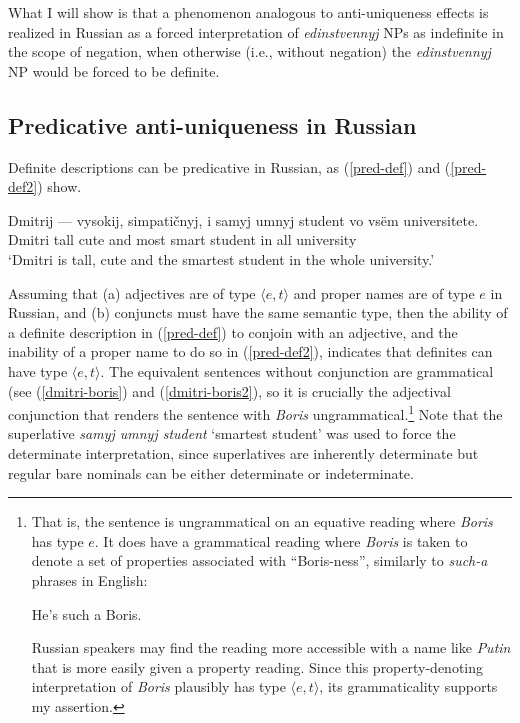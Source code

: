 What I will show is that a phenomenon analogous to anti-uniqueness effects is realized in Russian as a forced interpretation of \textit{edinstvennyj} NPs as indefinite in the scope of negation, when otherwise (i.e., without negation) the \textit{edinstvennyj} NP would be forced to be definite.

\subsection{Predicative anti-uniqueness in Russian}
Definite descriptions can be predicative in Russian, as (\ref{pred-def}) and (\ref{pred-def2}) show.

\begin{exe}
	\ex \label{pred-def} \gll Dmitrij --- vysokij, simpati\v{c}nyj, i samyj umnyj student vo vs\"{e}m universitete.\\
	Dmitri {} tall cute and most smart student in all university\\
	\glt `Dmitri is tall, cute and the smartest student in the whole university.'

\end{exe}

Assuming that (a) adjectives are of type $\langle e, t \rangle$ and proper names are of type $e$ in Russian, and (b) conjuncts must have the same semantic type, then the ability of a definite description in (\ref{pred-def}) to conjoin with an adjective, and the inability of a proper name to do so in (\ref{pred-def2}), indicates that definites can have type $\langle e, t \rangle$. The equivalent sentences without conjunction are grammatical (see (\ref{dmitri-boris}) and (\ref{dmitri-boris2}), so it is crucially the adjectival conjunction that renders the sentence with \textit{Boris} ungrammatical.\footnote{That is, the sentence is ungrammatical on an equative reading where \textit{Boris} has type $e$. It does have a grammatical reading where \textit{Boris} is taken to denote a set of properties associated with ``Boris-ness'', similarly to \textit{such-a} phrases in English: \begin{exe} \ex He's such a Boris.\end{exe} Russian speakers may find the reading more accessible with a name like \textit{Putin} that is more easily given a property reading. Since this property-denoting interpretation of \textit{Boris} plausibly has type $\langle e, t \rangle$, its grammaticality supports my assertion.} Note that the superlative \textit{samyj umnyj student} `smartest student' was used to force the determinate interpretation, since superlatives are inherently determinate but regular bare nominals can be either determinate or indeterminate.

